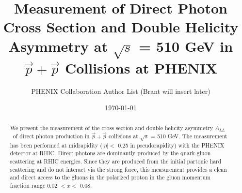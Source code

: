 \documentclass[twocolumn,letterpaper,aps,prl,longbibliography,superscriptaddress,floatfix]{revtex4-2}
\newcommand{\ALL}{\ensuremath{A_{LL}}}
\begin{document}


\title{Measurement of Direct Photon Cross Section and Double Helicity Asymmetry at $\sqrt{s}$ = 510 GeV in $\vec{p}+\vec{p}$ Collisions at PHENIX}

\author{PHENIX Collaboration Author List (Brant will insert later)}

\date{\today}

\begin{abstract}
We present the measurement of the cross section and double helicity asymmetry \ALL\ of direct photon production in $\vec{p}+\vec{p}$ collisions at $\sqrt{s}$ = 510 GeV. The measurement has been performed at midrapidity ($|\eta| <$ 0.25 in pseudorapidity) with the PHENIX detector at RHIC. Direct photons are dominantly produced by the quark-gluon scattering at RHIC energies. Since they are produced from the initial partonic hard scattering and do not interact via the strong force, this measurement provides a clean and direct access to the gluons in the polarized proton in the gluon momentum fraction range 0.02 $< x <$ 0.08.
\end{abstract}

	
\maketitle
\end{document}
